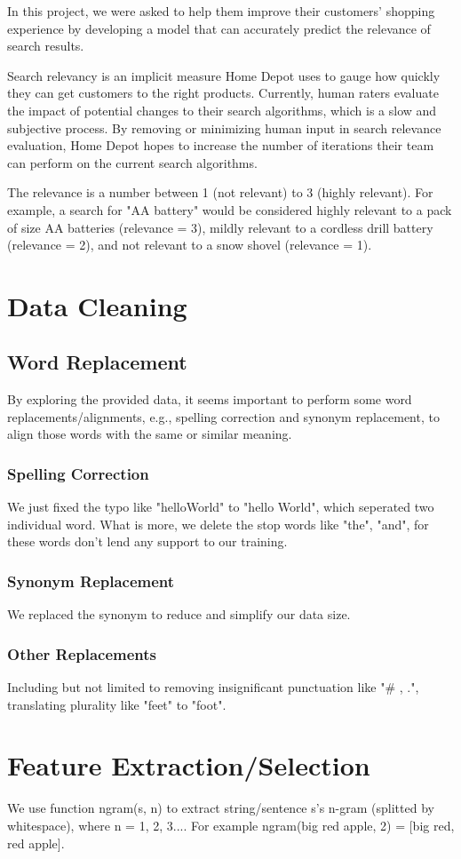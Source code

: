\documentclass[journal]{IEEEtran}
\begin{document}
In this project, we were asked to help them improve their customers' shopping experience by developing a model that can accurately predict the relevance of search results.

Search relevancy is an implicit measure Home Depot uses to gauge how quickly they can get customers to the right products. Currently, human raters evaluate the impact of potential changes to their search algorithms, which is a slow and subjective process. By removing or minimizing human input in search relevance evaluation, Home Depot hopes to increase the number of iterations their team can perform on the current search algorithms.

The relevance is a number between 1 (not relevant) to 3 (highly relevant). For example, a search for "AA battery" would be considered highly relevant to a pack of size AA batteries (relevance = 3), mildly relevant to a cordless drill battery (relevance = 2), and not relevant to a snow shovel (relevance = 1).
\section{Data Cleaning}
\subsection{Word Replacement}
By exploring the provided data, it seems important to perform some word replacements/alignments, e.g., spelling correction and synonym replacement, to align those words with the same or similar meaning.
\subsubsection{Spelling Correction}
We just fixed the typo like "helloWorld" to "hello World", which seperated two individual word. What is more, we delete the stop words like "the", "and", for these words don't lend any support to our training.
\subsubsection{Synonym Replacement}
We replaced the synonym to reduce and simplify our data size.
\subsubsection{Other Replacements}
Including but not limited to removing insignificant punctuation like "\# , .", translating plurality like "feet" to "foot".
\section{Feature Extraction/Selection}
We use function ngram(s, n) to extract string/sentence s’s n-gram (splitted by whitespace), where n = 1, 2, 3.... For example ngram(big red apple, 2) = [big red, red apple].
\end{document}
